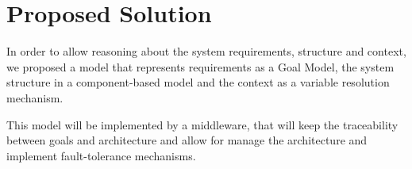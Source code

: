 \section{Proposed Solution}

In order to allow reasoning about the system requirements, structure and context, we proposed a model that represents requirements as a Goal Model, the system structure in a component-based model and the context as a variable resolution mechanism.

This model will be implemented by a middleware, that will keep the traceability between goals and architecture and allow for manage the architecture and implement fault-tolerance mechanisms.
